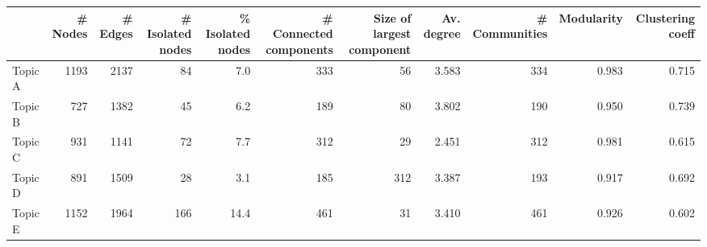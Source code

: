 \begin{tabular}{lrrrrrrrrrr}
\toprule
{} &  \# Nodes &  \# Edges &  \# Isolated nodes &  \% Isolated nodes &  \# Connected components &  Size of largest component &  Av. degree &  \# Communities &  Modularity &  Clustering coeff \\
\midrule
Topic A &     1193 &     2137 &                84 &               7.0 &                     333 &                         56 &       3.583 &            334 &       0.983 &             0.715 \\
Topic B &      727 &     1382 &                45 &               6.2 &                     189 &                         80 &       3.802 &            190 &       0.950 &             0.739 \\
Topic C &      931 &     1141 &                72 &               7.7 &                     312 &                         29 &       2.451 &            312 &       0.981 &             0.615 \\
Topic D &      891 &     1509 &                28 &               3.1 &                     185 &                        312 &       3.387 &            193 &       0.917 &             0.692 \\
Topic E &     1152 &     1964 &               166 &              14.4 &                     461 &                         31 &       3.410 &            461 &       0.926 &             0.602 \\
\bottomrule
\end{tabular}
